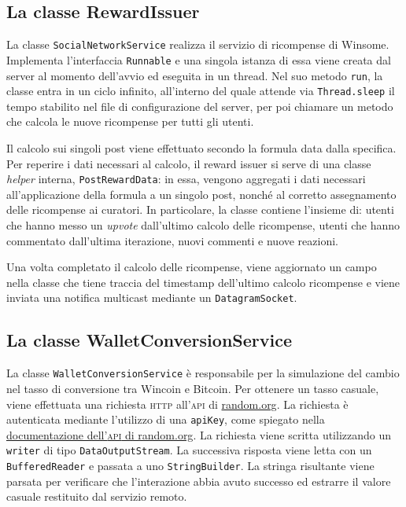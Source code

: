 \documentclass[a4paper,8pt]{article} %
\def\code#1{\texttt{#1}}
\begin{document}
\subsection{La classe RewardIssuer}
La classe \code{SocialNetworkService} realizza il servizio di ricompense di Winsome. Implementa l'interfaccia \code{Runnable} e una singola istanza di essa viene creata dal server al momento dell'avvio ed eseguita in un thread.
Nel suo metodo \code{run}, la classe entra in un ciclo infinito, all'interno del quale attende via \code{Thread.sleep} il tempo stabilito nel file di configurazione del server, per poi chiamare un metodo che calcola
le nuove ricompense per tutti gli utenti.
\par Il calcolo sui singoli post viene effettuato secondo la formula data dalla specifica. Per reperire i dati necessari al calcolo, il reward issuer si serve di una classe \emph{helper} interna, \code{PostRewardData}: in essa,
vengono aggregati i dati necessari all'applicazione della formula a un singolo post, nonché al corretto assegnamento delle ricompense ai curatori. In particolare, la classe contiene l'insieme di: utenti che hanno messo un \emph{upvote}
dall'ultimo calcolo delle ricompense, utenti che hanno commentato dall'ultima iterazione, nuovi commenti e nuove reazioni.
\par Una volta completato il calcolo delle ricompense, viene aggiornato un campo nella classe che tiene traccia del timestamp dell'ultimo calcolo ricompense e viene inviata una notifica multicast mediante un \code{DatagramSocket}.

\subsection{La classe WalletConversionService}
La classe \code{WalletConversionService} è responsabile per la simulazione del cambio nel tasso di conversione tra Wincoin e Bitcoin.
Per ottenere un tasso casuale, viene effettuata una richiesta \textsc{http} all'\textsc{api} di \href{https://random.org}{random.org}. La richiesta è autenticata mediante l'utilizzo di una \code{apiKey}, come spiegato nella
\href{https://api.random.org/json-rpc/4/basic}{documentazione dell'\textsc{api} di random.org}. La richiesta viene scritta utilizzando un \code{writer} di tipo \code{DataOutputStream}. La successiva risposta viene letta
con un \code{BufferedReader} e passata a uno \code{StringBuilder}. La stringa risultante viene parsata per verificare che l'interazione abbia avuto successo ed estrarre il valore casuale restituito dal servizio remoto.
\end{document}

